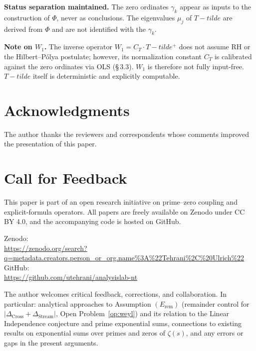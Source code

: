 \documentclass[11pt]{article}
\def\Tt{T-tilde}%
\newcommand{\Tt}{\widetilde{T}}
\newcommand{\CT}{C_{T}}
\newcommand{\Wone}{W_1}
\newcommand{\Dcross}{\Delta_{\mathrm{Cross}}}
\newcommand{\Dstream}{\Delta_{\mathrm{Stream}}}
\begin{document}
\textbf{Status separation maintained.}
The zero ordinates $\gamma_k$ appear as inputs to the construction
of $\Phi$, never as conclusions. The eigenvalues $\mu_j$ of $\Tt$
are derived from $\Phi$ and are not identified with the $\gamma_k$.

\textbf{Note on $\Wone$.}
The inverse operator $\Wone = \CT\cdot\Tt^+$ does not assume RH or
the Hilbert--P\'olya postulate; however, its normalization constant
$\CT$ is calibrated against the zero ordinates via OLS (\S\,3.3).
$\Wone$ is therefore not fully input-free. $\Tt$ itself is
deterministic and explicitly computable.

\section*{Acknowledgments}

The author thanks the reviewers and correspondents whose
comments improved the presentation of this paper.

\section*{Call for Feedback}

This paper is part of an open research initiative on prime--zero
coupling and explicit-formula operators.
All papers are freely available on Zenodo under CC BY 4.0, and the
accompanying code is hosted on GitHub.

{\raggedright
Zenodo:\\
\url{https://zenodo.org/search?q=metadata.creators.person_or_org.name\%3A\%22Tehrani\%2C\%20Ulrich\%22}\\
GitHub:\\
\url{https://github.com/utehrani/analysislab-nt}
\par}

The author welcomes critical feedback, corrections, and collaboration.
In particular: analytical approaches to Assumption $(E_{\mathrm{rem}})$
(remainder control for $|\Dcross+\Dstream|$,
Open Problem~\ref{op:weyl}) and its relation to the
Linear Independence conjecture and prime exponential sums,
connections to existing results on exponential sums
over primes and zeros of $\zeta(s)$,
and any errors or gaps in the present arguments.
\end{document}
